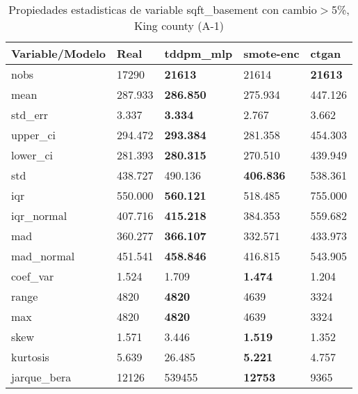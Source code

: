\begin{table}[H]
\centering
\fontsize{8}{14}\selectfont
\caption{Propiedades estadisticas de variable sqft\_basement con cambio\ensuremath{>}5\%, King county (A-1)}
\label{table-stats-king county-a-1-sqft_basement-short}
\begin{tabular}{|l|m{10em}|m{10em}|m{10em}|m{10em}|}
\hline
 \rowcolor[gray]{0.8}
Variable/Modelo & Real & tddpm\_mlp & smote-enc & ctgan \\
\hline nobs & 17290 & \bfseries 21613 & \cellcolor[rgb]{0.9, 0.54, 0.52} 21614 & \bfseries 21613 \\
\hline mean & 287.933 & \bfseries 286.850 & 275.934 & \cellcolor[rgb]{0.9, 0.54, 0.52} 447.126 \\
\hline std\_err & 3.337 & \bfseries 3.334 & \cellcolor[rgb]{0.9, 0.54, 0.52} 2.767 & 3.662 \\
\hline upper\_ci & 294.472 & \bfseries 293.384 & 281.358 & \cellcolor[rgb]{0.9, 0.54, 0.52} 454.303 \\
\hline lower\_ci & 281.393 & \bfseries 280.315 & 270.510 & \cellcolor[rgb]{0.9, 0.54, 0.52} 439.949 \\
\hline std & 438.727 & 490.136 & \bfseries 406.836 & \cellcolor[rgb]{0.9, 0.54, 0.52} 538.361 \\
\hline iqr & 550.000 & \bfseries 560.121 & 518.485 & \cellcolor[rgb]{0.9, 0.54, 0.52} 755.000 \\
\hline iqr\_normal & 407.716 & \bfseries 415.218 & 384.353 & \cellcolor[rgb]{0.9, 0.54, 0.52} 559.682 \\
\hline mad & 360.277 & \bfseries 366.107 & 332.571 & \cellcolor[rgb]{0.9, 0.54, 0.52} 433.973 \\
\hline mad\_normal & 451.541 & \bfseries 458.846 & 416.815 & \cellcolor[rgb]{0.9, 0.54, 0.52} 543.905 \\
\hline coef\_var & 1.524 & 1.709 & \bfseries 1.474 & \cellcolor[rgb]{0.9, 0.54, 0.52} 1.204 \\
\hline range & 4820 & \bfseries 4820 & 4639 & \cellcolor[rgb]{0.9, 0.54, 0.52} 3324 \\
\hline max & 4820 & \bfseries 4820 & 4639 & \cellcolor[rgb]{0.9, 0.54, 0.52} 3324 \\
\hline skew & 1.571 & \cellcolor[rgb]{0.9, 0.54, 0.52} 3.446 & \bfseries 1.519 & 1.352 \\
\hline kurtosis & 5.639 & \cellcolor[rgb]{0.9, 0.54, 0.52} 26.485 & \bfseries 5.221 & 4.757 \\
\hline jarque\_bera & 12126 & \cellcolor[rgb]{0.9, 0.54, 0.52} 539455 & \bfseries 12753 & 9365 \\

\end{tabular}
\end{table}

